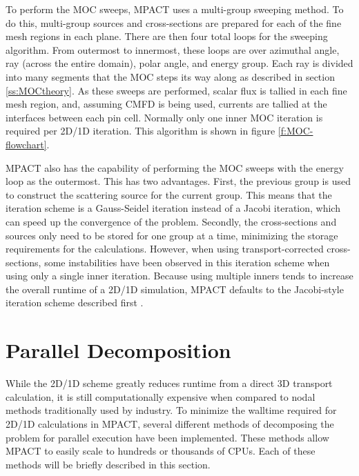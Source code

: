 To perform the MOC sweeps, MPACT uses a multi-group sweeping method.  To do this, multi-group sources and cross-sections are prepared for each of the fine mesh regions in each plane.  There are then four total loops for the sweeping algorithm.  From outermost to innermost, these loops are over azimuthal angle, ray (across the entire domain), polar angle, and energy group.  Each ray is divided into many segments that the MOC steps its way along as described in section \ref{ss:MOCtheory}.  As these sweeps are performed, scalar flux is tallied in each fine mesh region, and, assuming CMFD is being used, currents are tallied at the interfaces between each pin cell.  Normally only one inner MOC iteration is required per 2D/1D iteration.  This algorithm is shown in figure \ref{f:MOC-flowchart}.

MPACT also has the capability of performing the MOC sweeps with the energy loop as the outermost.  This has two advantages.  First, the previous group is used to construct the scattering source for the current group.  This means that the iteration scheme is a Gauss-Seidel iteration instead of a Jacobi iteration, which can speed up the convergence of the problem.  Secondly, the cross-sections and sources only need to be stored for one group at a time, minimizing the storage requirements for the calculations.  However, when using transport-corrected cross-sections, some instabilities have been observed in this iteration scheme when using only a single inner iteration.  Because using multiple inners tends to increase the overall runtime of a 2D/1D simulation, MPACT defaults to the Jacobi-style iteration scheme described first .

\section{Parallel Decomposition}

While the 2D/1D scheme greatly reduces runtime from a direct 3D transport calculation, it is still computationally expensive when compared to nodal methods traditionally used by industry.  To minimize the walltime required for 2D/1D calculations in MPACT, several different methods of decomposing the problem for parallel execution have been implemented.  These methods allow MPACT to easily scale to hundreds or thousands of CPUs.  Each of these methods will be briefly described in this section.

